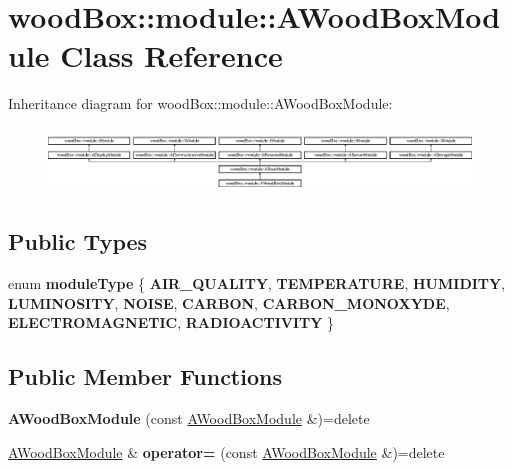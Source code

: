 \hypertarget{classwood_box_1_1module_1_1_a_wood_box_module}{}\section{wood\+Box\+:\+:module\+:\+:A\+Wood\+Box\+Module Class Reference}
\label{classwood_box_1_1module_1_1_a_wood_box_module}
Inheritance diagram for wood\+Box\+:\+:module\+:\+:A\+Wood\+Box\+Module\+:\begin{figure}[H]
\begin{center}
\leavevmode
\includegraphics[height=1.729730cm]{classwood_box_1_1module_1_1_a_wood_box_module}
\end{center}
\end{figure}
\subsection*{Public Types}
\begin{DoxyCompactItemize}
\item 
\mbox{\label{classwood_box_1_1module_1_1_a_wood_box_module_a9700d669ca2a36d350526c6b77dd2e1b}} 
enum {\bfseries module\+Type} \{ \newline
{\bfseries A\+I\+R\+\_\+\+Q\+U\+A\+L\+I\+TY}, 
{\bfseries T\+E\+M\+P\+E\+R\+A\+T\+U\+RE}, 
{\bfseries H\+U\+M\+I\+D\+I\+TY}, 
{\bfseries L\+U\+M\+I\+N\+O\+S\+I\+TY}, 
\newline
{\bfseries N\+O\+I\+SE}, 
{\bfseries C\+A\+R\+B\+ON}, 
{\bfseries C\+A\+R\+B\+O\+N\+\_\+\+M\+O\+N\+O\+X\+Y\+DE}, 
{\bfseries E\+L\+E\+C\+T\+R\+O\+M\+A\+G\+N\+E\+T\+IC}, 
\newline
{\bfseries R\+A\+D\+I\+O\+A\+C\+T\+I\+V\+I\+TY}
 \}
\end{DoxyCompactItemize}
\subsection*{Public Member Functions}
\begin{DoxyCompactItemize}
\item 
\mbox{\label{classwood_box_1_1module_1_1_a_wood_box_module_add6d18367bec65a3917f863b654c4319}} 
{\bfseries A\+Wood\+Box\+Module} (const \mbox{\hyperlink{classwood_box_1_1module_1_1_a_wood_box_module}{A\+Wood\+Box\+Module}} \&)=delete
\item 
\mbox{\label{classwood_box_1_1module_1_1_a_wood_box_module_ae9f462f6e239ee6ea02cb0ece7c8e7b2}} 
\mbox{\hyperlink{classwood_box_1_1module_1_1_a_wood_box_module}{A\+Wood\+Box\+Module}} \& {\bfseries operator=} (const \mbox{\hyperlink{classwood_box_1_1module_1_1_a_wood_box_module}{A\+Wood\+Box\+Module}} \&)=delete
\end{DoxyCompactItemize}
